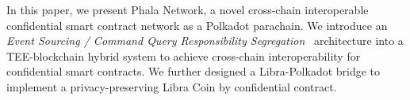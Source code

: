 In this paper, we present Phala Network, a novel cross-chain interoperable confidential smart contract network as a Polkadot parachain. We introduce an \textit{Event Sourcing / Command Query Responsibility Segregation}~\cite{eventsourcing, cqrs} architecture into a TEE-blockchain hybrid system to achieve cross-chain interoperability for confidential smart contracts. We further designed a Libra-Polkadot bridge to implement a privacy-preserving Libra Coin by confidential contract.
